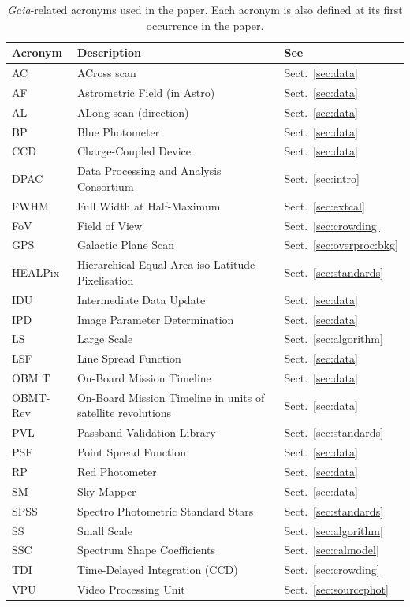 \documentclass{aa}
\newcommand{\gaia}{\textit{Gaia}\xspace}
\newcommand{\secname}{Sect.}
\newcommand{\secref}[1]{\secname~\ref{sec:#1}}
\begin{document}
\begin{appendix}
\begin{table}[hp]
    \caption{\gaia-related acronyms used in the paper. Each acronym is also defined at its first occurrence in the paper.}
    \label{tab:acronyms}
    \centering
    \begin{tabular}{l|l|l}\hline\hline
Acronym & Description & See \\\hline
AC & ACross scan & \secref{data} \\
AF & Astrometric Field (in Astro) & \secref{data}\\
AL & ALong scan (direction) & \secref{data} \\
BP & Blue Photometer & \secref{data}\\
CCD & Charge-Coupled Device & \secref{data}\\
DPAC & Data Processing and Analysis Consortium & \secref{intro}\\
FWHM & Full Width at Half-Maximum & \secref{extcal} \\
FoV & Field of View & \secref{crowding} \\
GPS & Galactic Plane Scan & \secref{overproc:bkg} \\
HEALPix & Hierarchical Equal-Area iso-Latitude Pixelisation & \secref{standards} \\
IDU & Intermediate Data Update & \secref{data}\\
IPD & Image Parameter Determination & \secref{data}\\
LS & Large Scale & \secref{algorithm}\\
LSF & Line Spread Function & \secref{data}\\
OBM T &On-Board Mission Timeline & \secref{data}\\
OBMT-Rev & On-Board Mission Timeline in units of satellite revolutions &\secref{data} \\
PVL & Passband Validation Library & \secref{standards} \\
PSF & Point Spread Function & \secref{data}\\
RP & Red Photometer & \secref{data}\\
SM & Sky Mapper & \secref{data}\\
SPSS & Spectro Photometric Standard Stars & \secref{standards}\\
SS & Small Scale & \secref{algorithm}\\
SSC & Spectrum Shape Coefficients & \secref{calmodel} \\
TDI & Time-Delayed Integration (CCD) & \secref{crowding} \\
VPU & Video Processing Unit & \secref{sourcephot} \\\hline
\end{tabular}
\end{table}


\end{appendix}
\end{document}
